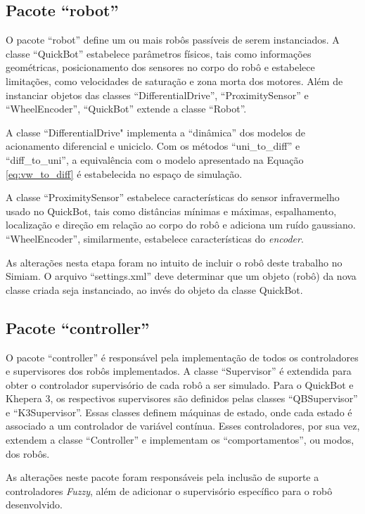 	\subsection{Pacote ``robot''}
	
	O pacote ``robot'' define um ou mais robôs passíveis de serem instanciados. A
	classe ``QuickBot'' estabelece parâmetros físicos, tais como informações
	geométricas, posicionamento dos sensores no corpo do robô e estabelece
	limitações, como velocidades de saturação e zona morta dos motores. Além de
	instanciar objetos das classes ``DifferentialDrive'', ``ProximitySensor'' e
	``WheelEncoder'', ``QuickBot'' extende a classe ``Robot''. 
	
	A classe ``DifferentialDrive" implementa a ``dinâmica'' dos modelos de
	acionamento diferencial e uniciclo. Com os métodos ``uni\_to\_diff'' e ``diff\_to\_uni'', a
	equivalência com o modelo apresentado na Equação \ref{eq:vw_to_diff} é
	estabelecida no espaço de simulação. 

	A classe ``ProximitySensor'' estabelece características do sensor infravermelho
	usado no QuickBot, tais como distâncias mínimas e máximas, espalhamento, localização e
	direção em relação ao corpo do robô e adiciona um ruído gaussiano.
	``WheelEncoder'', similarmente, estabelece características do \textit{encoder}.
	
	As alterações nesta etapa foram no intuito de incluir o robô deste trabalho
	no Simiam. O arquivo ``settings.xml'' deve determinar que um objeto (robô) da
	nova classe criada seja instanciado, ao invés do objeto da classe QuickBot.
	
	\subsection{Pacote ``controller''}
	
	O pacote ``controller'' é responsável pela implementação de todos os
	controladores e supervisores dos robôs implementados. A classe ``Supervisor'' é
	extendida para obter o controlador supervisório de cada robô a ser simulado.
	Para o QuickBot e Khepera 3, os respectivos supervisores são definidos pelas
	classes ``QBSupervisor'' e ``K3Supervisor''. Essas classes definem máquinas de
	estado, onde cada estado é associado a um controlador de variável contínua.
	Esses controladores, por sua vez, extendem a classe ``Controller'' e
	implementam os ``comportamentos'', ou modos, dos robôs.
	
	As alterações neste pacote foram responsáveis pela inclusão de suporte a
	controladores \textit{Fuzzy}, além de adicionar o supervisório específico para
	o robô desenvolvido.
	
